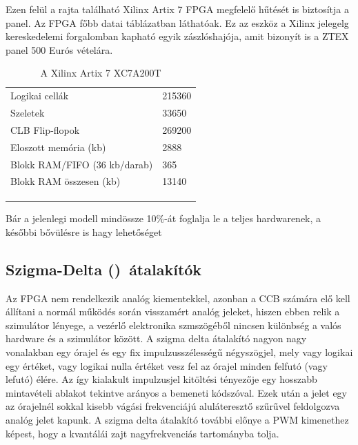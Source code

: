 
Ezen felül a rajta található Xilinx Artix 7 FPGA megfelelő hűtését is biztosítja a panel. Az FPGA főbb datai  táblázatban láthatóak. Ez az eszköz a Xilinx jelegelg kereskedelemi forgalomban kapható egyik zászlóshajója, amit bizonyít is a ZTEX panel 500 Eurós vételára.

\begin{table}[]
\centering
\begin{tabular}{ll}
Logikai cellák               & 215360 \\
Szeletek                     & 33650  \\
CLB Flip-flopok              & 269200 \\
Eloszott memória (kb)        & 2888   \\
Blokk RAM/FIFO (36 kb/darab) & 365    \\
Blokk RAM összesen (kb)      & 13140  \\
                             &        \\
                             &        \\
                             & 
  
\end{tabular}
\caption{A Xilinx Artix 7 XC7A200T}
\label{artix7spec}    
\end{table}

Bár a jelenlegi modell mindössze 10\%-át foglalja le a teljes hardwarenek, a későbbi bővülésre is hagy lehetőséget

\subsection{Szigma-Delta (\Sigma\Delta)\ átalakítók}

Az FPGA nem rendelkezik analóg kiementekkel, azonban a CCB számára elő kell állítani a normál működés során visszamért analóg jeleket, hiszen ebben relik a szimulátor lényege, a vezérlő elektronika szmszögéből nincsen különbség a valós hardware és a szimulátor között. A szigma delta átalakító nagyon nagy vonalakban egy órajel és egy fix impulzusszélességű négyszögjel, mely vagy logikai egy értéket, vagy logikai nulla értéket vesz fel az órajel minden felfutó (vagy lefutó) élére. Az így kialakult impulzusjel kitöltési tényezője egy hosszabb mintavételi ablakot tekintve arányos a bemeneti kódszóval. Ezek után a jelet egy az órajelnél sokkal kisebb vágási frekvenciájú aluláteresztő szűrűvel feldolgozva analóg jelet kapunk. A szigma delta átalakító további előnye a PWM kimenethez képest, hogy a kvantálái zajt nagyfrekvenciás tartományba tolja.\cite{artofelectronics}

